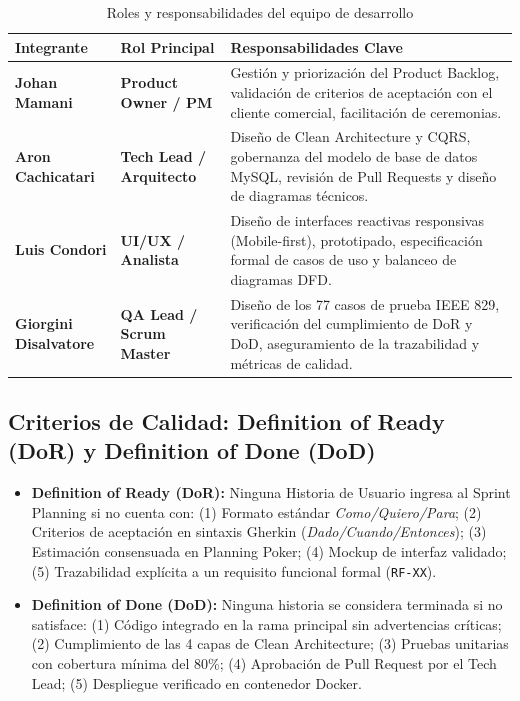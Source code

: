 \begin{table}[H]
\centering
\small
\begin{tabularx}{\textwidth}{>{\bfseries}p{3.5cm} >{\bfseries}p{3.8cm} Y}
\toprule
\textbf{Integrante} & \textbf{Rol Principal} & \textbf{Responsabilidades Clave} \\
\midrule
Johan Mamani & Product Owner / PM & Gestión y priorización del Product Backlog, validación de criterios de aceptación con el cliente comercial, facilitación de ceremonias. \\
\addlinespace
Aron Cachicatari & Tech Lead / Arquitecto & Diseño de Clean Architecture y CQRS, gobernanza del modelo de base de datos MySQL, revisión de Pull Requests y diseño de diagramas técnicos. \\
\addlinespace
Luis Condori & UI/UX / Analista & Diseño de interfaces reactivas responsivas (Mobile-first), prototipado, especificación formal de casos de uso y balanceo de diagramas DFD. \\
\addlinespace
Giorgini Disalvatore & QA Lead / Scrum Master & Diseño de los 77 casos de prueba IEEE 829, verificación del cumplimiento de DoR y DoD, aseguramiento de la trazabilidad y métricas de calidad. \\
\bottomrule
\end{tabularx}
\caption{Roles y responsabilidades del equipo de desarrollo}
\label{tab:roles_equipo}
\end{table}

\subsection{Criterios de Calidad: Definition of Ready (DoR) y Definition of Done (DoD)}
\begin{itemize}
    \item \textbf{Definition of Ready (DoR):} Ninguna Historia de Usuario ingresa al Sprint Planning si no cuenta con: (1) Formato estándar \textit{Como/Quiero/Para}; (2) Criterios de aceptación en sintaxis Gherkin (\textit{Dado/Cuando/Entonces}); (3) Estimación consensuada en Planning Poker; (4) Mockup de interfaz validado; (5) Trazabilidad explícita a un requisito funcional formal (\texttt{RF-XX}).
    \item \textbf{Definition of Done (DoD):} Ninguna historia se considera terminada si no satisface: (1) Código integrado en la rama principal sin advertencias críticas; (2) Cumplimiento de las 4 capas de Clean Architecture; (3) Pruebas unitarias con cobertura mínima del 80\%; (4) Aprobación de Pull Request por el Tech Lead; (5) Despliegue verificado en contenedor Docker.
\end{itemize}
